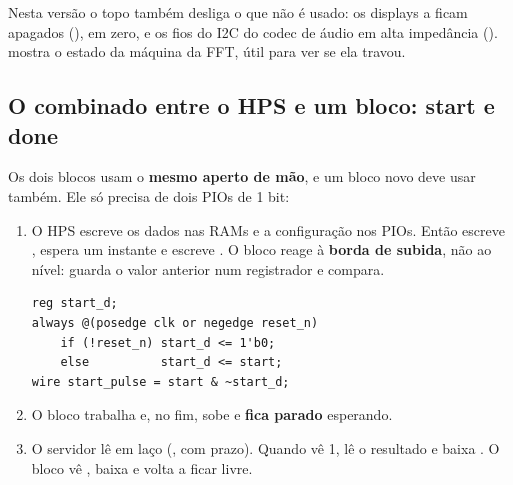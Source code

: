 \documentclass[11pt,a4paper,oneside]{article}
\begin{document}
Nesta versão o topo também desliga o que não é usado: os displays 
a  ficam apagados (),  em zero, e os fios
do I2C do codec de áudio em alta impedância (). 
mostra o estado da máquina da FFT, útil para ver se ela travou.

\subsection{O combinado entre o HPS e um bloco: start e done}\label{sec:startdone}

Os dois blocos usam o \textbf{mesmo aperto de mão}, e um bloco novo deve usar
também. Ele só precisa de dois PIOs de 1 bit:

\begin{center}
\end{center}

\begin{enumerate}
  \item O HPS escreve os dados nas RAMs e a configuração nos PIOs. Então
    escreve , espera um instante e escreve . O
    bloco reage à \textbf{borda de subida}, não ao nível: guarda o valor
    anterior num registrador e compara.
\begin{lstlisting}
reg start_d;
always @(posedge clk or negedge reset_n)
    if (!reset_n) start_d <= 1'b0;
    else          start_d <= start;
wire start_pulse = start & ~start_d;
\end{lstlisting}
  \item O bloco trabalha e, no fim, sobe  e \textbf{fica parado}
    esperando.
  \item O servidor lê  em laço (, com prazo). Quando
    vê 1, lê o resultado e baixa . O bloco vê ,
    baixa  e volta a ficar livre.
\end{enumerate}
\end{document}
